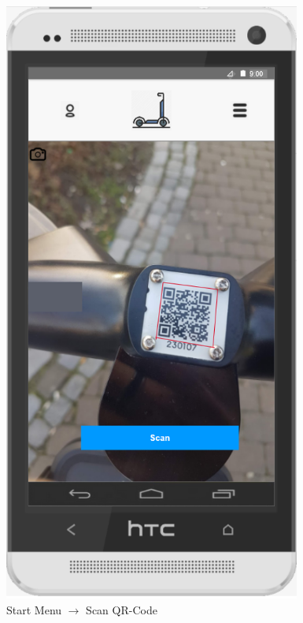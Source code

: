 \documentclass[a4paper, 12pt]{article}
\begin{document}
\begin{figure} [htbp]
\begin{center}
        \begin{minipage}{0.45\textwidth}
            \begin{center}
                \includegraphics[width=0.87\textwidth]{images/prototypes/01-01-start-menu--scan-qr-code.png}
            \end{center}
            \caption{Start Menu $\rightarrow$ Scan QR-Code}
        \end{minipage}
    \end{center}
\end{figure}
\end{document}
